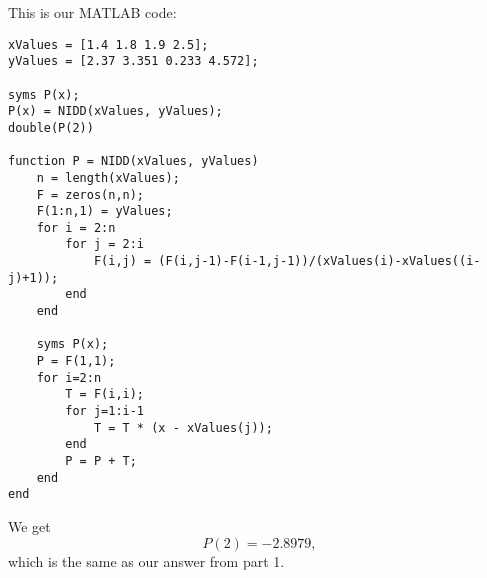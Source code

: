 \documentclass[12 pt, letterpaper]{exam}
\theoremstyle{definition}
\begin{document}
\begin{questions}
\begin{solution}
    This is our MATLAB code:
    \begin{lstlisting}
xValues = [1.4 1.8 1.9 2.5];
yValues = [2.37 3.351 0.233 4.572];

syms P(x);
P(x) = NIDD(xValues, yValues);
double(P(2))

function P = NIDD(xValues, yValues)
    n = length(xValues);
    F = zeros(n,n);
    F(1:n,1) = yValues;
    for i = 2:n
        for j = 2:i
            F(i,j) = (F(i,j-1)-F(i-1,j-1))/(xValues(i)-xValues((i-j)+1));
        end
    end
 
    syms P(x);
    P = F(1,1);
    for i=2:n
        T = F(i,i);
        for j=1:i-1
            T = T * (x - xValues(j));
        end
        P = P + T;
    end
end
    \end{lstlisting}
    We get
    $$ P(2) = -2.8979,$$
    which is the same as our answer from part 1.
\end{solution}

\end{questions}
\end{document}
